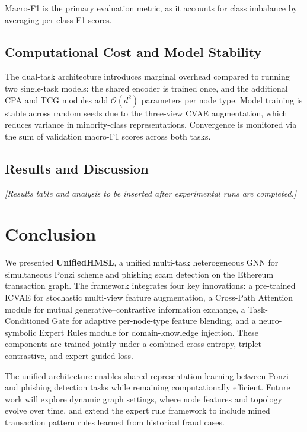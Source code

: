 \documentclass[conference]{IEEEtran}
\begin{document}
Macro-F1 is the primary evaluation metric, as it accounts for class
imbalance by averaging per-class F1 scores.

\subsection{Computational Cost and Model Stability}
The dual-task architecture introduces marginal overhead compared to
running two single-task models: the shared encoder is trained once,
and the additional CPA and TCG modules add $\mathcal{O}(d^2)$
parameters per node type.  Model training is stable across random
seeds due to the three-view CVAE augmentation, which reduces variance
in minority-class representations.  Convergence is monitored via the
sum of validation macro-F1 scores across both tasks.

\subsection{Results and Discussion}

\textit{[Results table and analysis to be inserted after experimental
runs are completed.]}

\section{Conclusion}
\label{sec:conclusion}

We presented \textbf{UnifiedHMSL}, a unified multi-task heterogeneous
GNN for simultaneous Ponzi scheme and phishing scam detection on the
Ethereum transaction graph.  The framework integrates four key
innovations: a pre-trained ICVAE for stochastic multi-view feature
augmentation, a Cross-Path Attention module for mutual generative--contrastive
information exchange, a Task-Conditioned Gate for adaptive per-node-type
feature blending, and a neuro-symbolic Expert Rules module for
domain-knowledge injection.  These components are trained jointly under
a combined cross-entropy, triplet contrastive, and expert-guided loss.

The unified architecture enables shared representation learning between
Ponzi and phishing detection tasks while remaining computationally
efficient.  Future work will explore dynamic graph settings, where node
features and topology evolve over time, and extend the expert rule
framework to include mined transaction pattern rules learned from
historical fraud cases.



\end{document}

